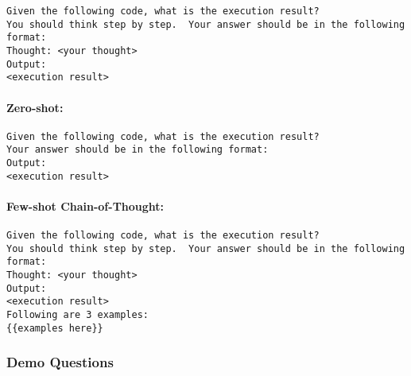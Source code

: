 \begin{tcolorbox}[left=0mm,right=0mm,top=0mm,bottom=0mm,boxsep=1mm,arc=0mm,boxrule=0pt, frame empty, breakable]
    \small
    \begin{lstlisting}
Given the following code, what is the execution result?
You should think step by step.  Your answer should be in the following format:
Thought: <your thought>
Output:
<execution result>
\end{lstlisting}
\end{tcolorbox}




\paragraph{Zero-shot:}

\begin{tcolorbox}[left=0mm,right=0mm,top=0mm,bottom=0mm,boxsep=1mm,arc=0mm,boxrule=0pt, frame empty, breakable]
    \small
    \begin{lstlisting}
Given the following code, what is the execution result?
Your answer should be in the following format:
Output:
<execution result>
\end{lstlisting}
\end{tcolorbox}




\paragraph{Few-shot Chain-of-Thought:}

\begin{tcolorbox}[left=0mm,right=0mm,top=0mm,bottom=0mm,boxsep=1mm,arc=0mm,boxrule=0pt, frame empty, breakable]
    \small
    \begin{lstlisting}
Given the following code, what is the execution result?
You should think step by step.  Your answer should be in the following format:
Thought: <your thought>
Output:
<execution result>
Following are 3 examples: 
{{examples here}}

\end{lstlisting}
\end{tcolorbox}





\subsubsection{Demo Questions}

